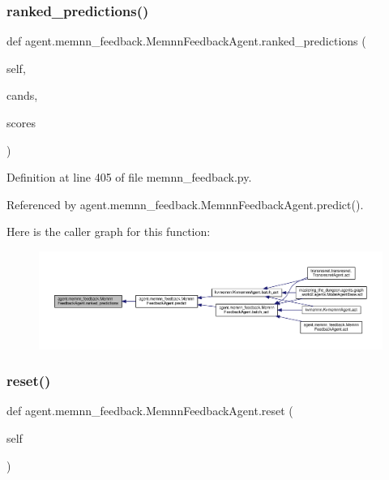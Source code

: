 \subsubsection{\texorpdfstring{ranked\+\_\+predictions()}{ranked\_predictions()}}
{\footnotesize\ttfamily def agent.\+memnn\+\_\+feedback.\+Memnn\+Feedback\+Agent.\+ranked\+\_\+predictions (\begin{DoxyParamCaption}\item[{}]{self,  }\item[{}]{cands,  }\item[{}]{scores }\end{DoxyParamCaption})}



Definition at line 405 of file memnn\+\_\+feedback.\+py.



Referenced by agent.\+memnn\+\_\+feedback.\+Memnn\+Feedback\+Agent.\+predict().

Here is the caller graph for this function\+:
\nopagebreak
\begin{figure}[H]
\begin{center}
\leavevmode
\includegraphics[width=350pt]{classagent_1_1memnn__feedback_1_1MemnnFeedbackAgent_a279d88f27de78da07c82a315b172f260_icgraph}
\end{center}
\end{figure}
\mbox{\label{classagent_1_1memnn__feedback_1_1MemnnFeedbackAgent_adac0929f10a12fb843214fc07df802b3}} 
\subsubsection{\texorpdfstring{reset()}{reset()}}
{\footnotesize\ttfamily def agent.\+memnn\+\_\+feedback.\+Memnn\+Feedback\+Agent.\+reset (\begin{DoxyParamCaption}\item[{}]{self }\end{DoxyParamCaption})}



